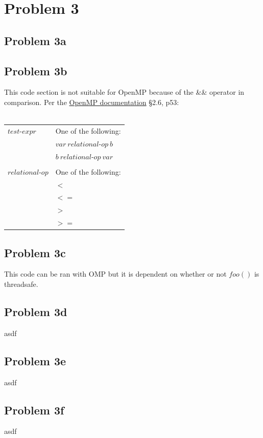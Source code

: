 \documentclass{article}
\begin{document}
\section{Problem 3}
\subsection{Problem 3a}

\subsection{Problem 3b}
This code section is not suitable for OpenMP because of the \&\& operator in comparison.
Per the \hyperlink{https://www.openmp.org/wp-content/uploads/openmp-4.5.pdf}{OpenMP documentation} \S2.6, p53:\\\\
\begin{tabular}{@{}ll}
$test$-$expr$ & One of the following:\\
& $var\ relational$-$op\ b$\\
& $b\ relational$-$op\ var$\\\\

$relational$-$op$ & One of the following:\\
& $<$  \\
& $<=$ \\
& $>$  \\
& $>=$ \\
\end{tabular}

\subsection{Problem 3c}
This code can be ran with OMP but it is dependent on whether or not $foo()$ is threadsafe.

\subsection{Problem 3d}
asdf

\subsection{Problem 3e}
asdf

\subsection{Problem 3f}
asdf
\end{document}
